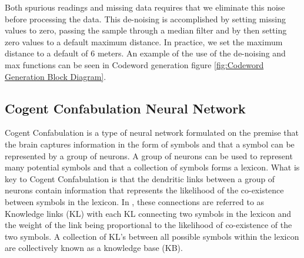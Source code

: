 \documentclass[journal]{IEEEtran}
\begin{document}
Both spurious readings and missing data requires that we eliminate this noise before processing the data.
This de-noising is accomplished by setting missing values to zero, passing the sample through a median filter and by then setting
zero values to a default maximum distance.
In practice, we set the maximum distance to a default of 6 meters.
An example of the use of the de-noising and max functions can be seen in Codeword generation figure \ref{fig:Codeword Generation Block Diagram}.

\subsection{Cogent Confabulation Neural Network}
\label{sec:Cogent Confabulation Neural Network}

Cogent Confabulation is a type of neural network formulated on the premise that the brain captures information in the form of symbols and that
a symbol can be represented by a group of neurons. A group of neurons can be used to represent many potential symbols and that 
a collection of symbols forms a lexicon.
What is key to Cogent Confabulation is that the dendritic links between a group of neurons contain information that
represents the likelihood of the co-existence between symbols in the lexicon. 
In \cite{HechtBOOK}\cite{Hecht2005}, these connections are referred to as Knowledge links (KL) with each KL connecting two symbols in the lexicon 
and the weight of the link being proportional to the likelihood of co-existence of the two symbols.
A collection of KL's between all possible symbols within the lexicon are collectively known as a knowledge base (KB).
\end{document}
